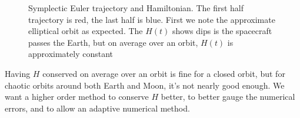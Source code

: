 \begin{figure}
    \centering
        \caption{Symplectic Euler trajectory and Hamiltonian. The first half trajectory is red, the last half is blue. First we note the approximate elliptical orbit as expected. The $H(t)$ shows dips is the spacecraft passes the Earth, but on average over an orbit, $H(t)$ is approximately constant}
        \label{fig:r3b_symplectic_euler}
\end{figure}
Having $H$ conserved on average over an orbit is fine for a closed orbit, but for chaotic orbits around both Earth and Moon, it's not nearly good enough. We want a higher order method to conserve $H$ better, to better gauge the numerical errors, and to allow an adaptive numerical method.

